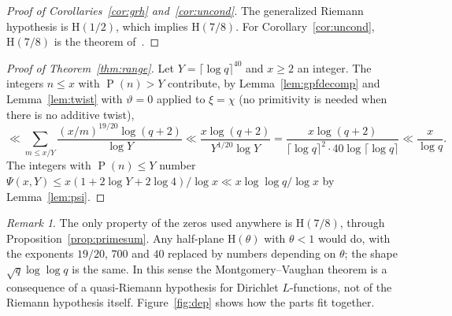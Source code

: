 \documentclass[11pt]{amsart}
\theoremstyle{definition}
\theoremstyle{remark}
\newtheorem{remark}[theorem]{Remark}
\numberwithin{equation}{section}
\DeclareMathOperator{\gpf}{P}
\begin{document}
\begin{proof}[Proof of Corollaries~\textup{\ref{cor:grh}} and~\textup{\ref{cor:uncond}}]
The generalized Riemann hypothesis is $\mathrm H(1/2)$, which implies $\mathrm
H(7/8)$. For Corollary~\ref{cor:uncond}, $\mathrm H(7/8)$ is the theorem of~\cite{openai}.
\end{proof}

\begin{proof}[Proof of Theorem~\textup{\ref{thm:range}}]
Let $Y=\lceil\log q\rceil^{40}$ and $x\ge2$ an integer. The integers $n\le x$ with
$\gpf(n)>Y$ contribute, by Lemma~\ref{lem:gpfdecomp} and Lemma~\ref{lem:twist}
with $\vartheta=0$ applied to $\xi=\chi$ (no primitivity is needed when there is
no additive twist),
\[
\ll\sum_{m\le x/Y}\frac{(x/m)^{19/20}\log(q+2)}{\log Y}\ll\frac{x\log(q+2)}{Y^{1/20}\log Y}=\frac{x\log(q+2)}{\lceil\log
q\rceil^2\cdot40\log\lceil\log q\rceil}\ll\frac x{\log q}.
\]
The integers with $\gpf(n)\le Y$ number $\Psi(x,Y)\le x(1+2\log Y+2\log4)/\log
x\ll x\log\log q/\log x$ by Lemma~\ref{lem:psi}.
\end{proof}

\begin{remark}
The only property of the zeros used anywhere is $\mathrm H(7/8)$, through
Proposition~\ref{prop:primesum}. Any half-plane $\mathrm H(\theta)$ with $\theta<1$
would do, with the exponents $19/20$, $700$ and $40$ replaced by numbers
depending on $\theta$; the shape $\sqrt q\log\log q$ is the same. In this sense
the Montgomery--Vaughan theorem is a consequence of a quasi-Riemann hypothesis
for Dirichlet $L$-functions, not of the Riemann hypothesis itself.
Figure~\ref{fig:dep} shows how the parts fit together.
\end{remark}
\end{document}
